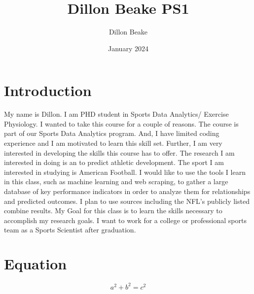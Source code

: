 \documentclass{article}
\title{Dillon Beake PS1}
\author{Dillon Beake}
\date{January 2024}
\begin{document}
\maketitle

\section{Introduction}
My name is Dillon. I am PHD student in Sports Data Analytics/ Exercise Physiology.  I wanted to take this course for a couple of reasons.  The course is part of our Sports Data Analytics program.  And, I have limited coding experience and I am motivated to learn this skill set.  Further, I am very interested in developing the skills this course has to offer.  The research I am interested in doing is an to predict athletic development.  The sport I am interested in studying is American Football.  I would like to use the tools I learn in this class, such as machine learning and web scraping, to gather a large database of key performance indicators in order to analyze them for relationships and predicted outcomes.  I plan to use sources including the NFL's publicly listed combine results. My Goal for this class is to learn the skills necessary to accomplish my research goals.  I want to work for a college or professional sports team as a Sports Scientist after graduation.  

\section{Equation}
\[a^2 + b^2 = c^2\]
\end{document}
